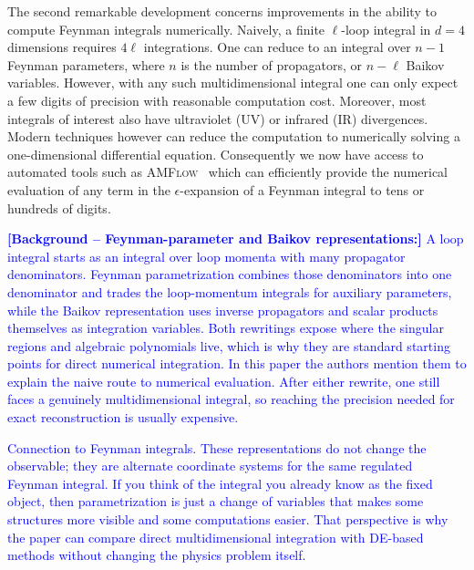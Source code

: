 \documentclass[a4paper,11pt]{article}
\makeatletter
\def\textcolor#1#{\kg@textcolor{#1}}
\makeatother
\begin{document}
The second remarkable development concerns improvements in the ability to compute Feynman integrals numerically. Naively, a  finite $\ell$-loop integral in $d=4$ dimensions requires $4\ell$ integrations. One can reduce to an integral over $n-1$ Feynman parameters, where $n$ is the number of propagators, or $n-\ell$ Baikov variables. However, with any such multidimensional integral one can only expect a few digits of precision with reasonable computation cost. Moreover, most integrals of interest also have ultraviolet (UV) or infrared (IR) divergences. Modern techniques however can reduce the computation to numerically solving a one-dimensional differential equation. Consequently we now have access to automated tools such as \textsc{AMFlow}~\cite{Liu:2017jxz, Liu:2018dmc, Liu:2021wks,Liu:2022chg, Liu:2022mfb} which can efficiently provide the numerical evaluation of any term in the $\epsilon$-expansion of a Feynman integral to tens or hundreds of digits. 
\textcolor{blue}{\small\textbf{[Background -- Feynman-parameter and Baikov representations:]} A loop integral starts as an integral over loop momenta with many propagator denominators. Feynman parametrization combines those denominators into one denominator and trades the loop-momentum integrals for auxiliary parameters, while the Baikov representation uses inverse propagators and scalar products themselves as integration variables. Both rewritings expose where the singular regions and algebraic polynomials live, which is why they are standard starting points for direct numerical integration. In this paper the authors mention them to explain the naive route to numerical evaluation. After either rewrite, one still faces a genuinely multidimensional integral, so reaching the precision needed for exact reconstruction is usually expensive.\par Connection to Feynman integrals. These representations do not change the observable; they are alternate coordinate systems for the same regulated Feynman integral. If you think of the integral you already know as the fixed object, then parametrization is just a change of variables that makes some structures more visible and some computations easier. That perspective is why the paper can compare direct multidimensional integration with DE-based methods without changing the physics problem itself.}
\end{document}
